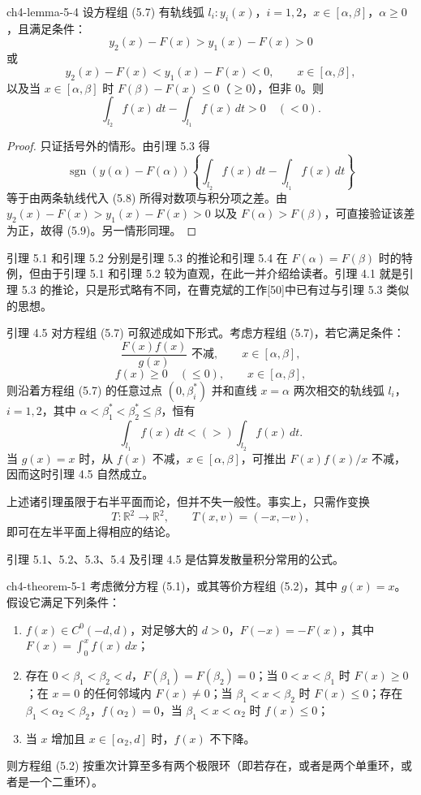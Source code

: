 \begin{lemma}{ }{ch4-lemma-5-4}
设方程组 (5.7) 有轨线弧 $l_i:y_i(x)$，$i=1,2$，$x\in[\alpha,\beta]$，$\alpha\geqslant0$，且满足条件：
\[
y_2(x)-F(x)>y_1(x)-F(x)>0
\]
或
\[
y_2(x)-F(x)<y_1(x)-F(x)<0,\qquad x\in[\alpha,\beta],
\]
以及当 $x\in[\alpha,\beta]$ 时 $F(\beta)-F(x)\leqslant0$（$\geqslant0$），但非 $0$。则
\begin{equation}
\int_{l_2}f(x)\,dt-\int_{l_1}f(x)\,dt>0\quad(<0).\tag{5.9}
\end{equation}
\end{lemma}

\begin{proof}
只证括号外的情形。由引理 5.3 得
\[
\operatorname{sgn}(y(\alpha)-F(\alpha))\left\{\int_{l_2}f(x)\,dt-\int_{l_1}f(x)\,dt\right\}
\]
等于由两条轨线代入 (5.8) 所得对数项与积分项之差。由 $y_2(x)-F(x)>y_1(x)-F(x)>0$ 以及 $F(\alpha)>F(\beta)$，可直接验证该差为正，故得 (5.9)。另一情形同理。
\end{proof}

引理 5.1 和引理 5.2 分别是引理 5.3 的推论和引理 5.4 在 $F(\alpha)=F(\beta)$ 时的特例，但由于引理 5.1 和引理 5.2 较为直观，在此一并介绍给读者。引理 4.1 就是引理 5.3 的推论，只是形式略有不同，在曹克斌的工作[50]中已有过与引理 5.3 类似的思想。

引理 4.5 对方程组 (5.7) 可叙述成如下形式。考虑方程组 (5.7)，若它满足条件：
\[
\dfrac{F(x)f(x)}{g(x)}\text{ 不减},\qquad x\in[\alpha,\beta],\tag{5.15}
\]
\[
f(x)\geqslant0\quad(\leqslant0),\qquad x\in[\alpha,\beta],
\]
则沿着方程组 (5.7) 的任意过点 $(0,\beta_i^*)$ 并和直线 $x=\alpha$ 两次相交的轨线弧 $l_i$，$i=1,2$，其中 $\alpha<\beta_1^*<\beta_2^*\leqslant\beta$，恒有
\begin{equation}
\int_{l_1}f(x)\,dt<(>)\int_{l_2}f(x)\,dt.\tag{5.16}
\end{equation}
当 $g(x)=x$ 时，从 $f(x)$ 不减，$x\in[\alpha,\beta]$，可推出 $F(x)f(x)/x$ 不减，因而这时引理 4.5 自然成立。

上述诸引理虽限于右半平面而论，但并不失一般性。事实上，只需作变换
\[
T:\mathbb R^2\longrightarrow\mathbb R^2,\qquad T(x,v)=(-x,-v),
\]
即可在左半平面上得相应的结论。

引理 5.1、5.2、5.3、5.4 及引理 4.5 是估算发散量积分常用的公式。

\begin{theorem}{ }{ch4-theorem-5-1}
考虑微分方程 (5.1)，或其等价方程组 (5.2)，其中 $g(x)=x$。假设它满足下列条件：
\begin{enumerate}
  \item $f(x)\in C^0(-d,d)$，对足够大的 $d>0$，$F(-x)=-F(x)$，其中 $F(x)=\int_0^x f(x)\,dx$；
  \item 存在 $0<\beta_1<\beta_2<d$，$F(\beta_1)=F(\beta_2)=0$；当 $0<x<\beta_1$ 时 $F(x)\geqslant0$；在 $x=0$ 的任何邻域内 $F(x)\ne0$；当 $\beta_1<x<\beta_2$ 时 $F(x)\leqslant0$；存在 $\beta_1<\alpha_2<\beta_2$，$f(\alpha_2)=0$，当 $\beta_1<x<\alpha_2$ 时 $f(x)\leqslant0$；
  \item 当 $x$ 增加且 $x\in[\alpha_2,d]$ 时，$f(x)$ 不下降。
\end{enumerate}
则方程组 (5.2) 按重次计算至多有两个极限环（即若存在，或者是两个单重环，或者是一个二重环）。
\end{theorem}

